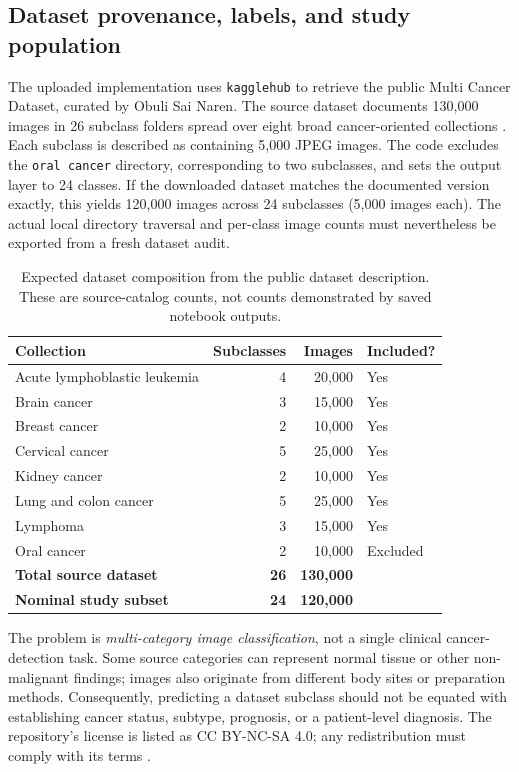 \documentclass[11pt,a4paper]{article}
\begin{document}
\subsection{Dataset provenance, labels, and study population}\label{subsec:dataset}
The uploaded implementation uses \texttt{kagglehub} to retrieve the public Multi Cancer Dataset, curated by Obuli Sai Naren. The source dataset documents 130,000 images in 26 subclass folders spread over eight broad cancer-oriented collections \citep{naren2022multicancer}. Each subclass is described as containing 5,000 JPEG images. The code excludes the \texttt{oral cancer} directory, corresponding to two subclasses, and sets the output layer to 24 classes. If the downloaded dataset matches the documented version exactly, this yields 120,000 images across 24 subclasses (5,000 images each). The actual local directory traversal and per-class image counts must nevertheless be exported from a fresh dataset audit.

\begin{table}[t]
\centering\small
\caption{Expected dataset composition from the public dataset description. These are source-catalog counts, not counts demonstrated by saved notebook outputs.}
\label{tab:dataset}
\begin{tabular}{lrrl}
\toprule
Collection & Subclasses & Images & Included?\\
\midrule
Acute lymphoblastic leukemia & 4 & 20,000 & Yes\\
Brain cancer & 3 & 15,000 & Yes\\
Breast cancer & 2 & 10,000 & Yes\\
Cervical cancer & 5 & 25,000 & Yes\\
Kidney cancer & 2 & 10,000 & Yes\\
Lung and colon cancer & 5 & 25,000 & Yes\\
Lymphoma & 3 & 15,000 & Yes\\
Oral cancer & 2 & 10,000 & Excluded\\
\midrule
\textbf{Total source dataset} & \textbf{26} & \textbf{130,000} & \\
\textbf{Nominal study subset} & \textbf{24} & \textbf{120,000} & \\
\bottomrule
\end{tabular}
\end{table}

The problem is \emph{multi-category image classification}, not a single clinical cancer-detection task. Some source categories can represent normal tissue or other non-malignant findings; images also originate from different body sites or preparation methods. Consequently, predicting a dataset subclass should not be equated with establishing cancer status, subtype, prognosis, or a patient-level diagnosis. The repository's license is listed as CC BY-NC-SA 4.0; any redistribution must comply with its terms \citep{naren2022multicancer}.
\end{document}
